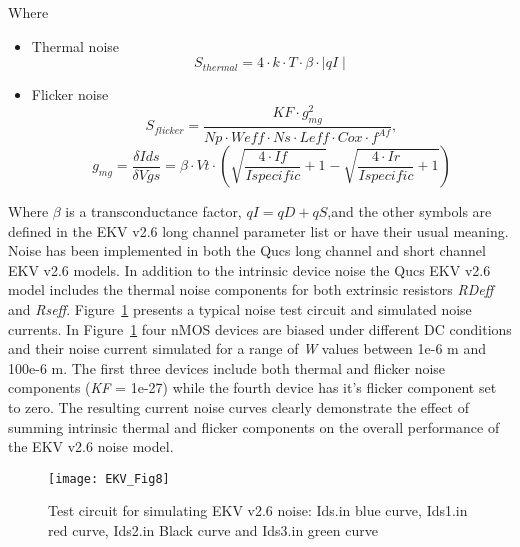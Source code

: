 Where
\begin{itemize}
 \item  Thermal noise
\hspace{20mm}     \begin{equation} 
			S_{thermal}=4 \cdot k \cdot T \cdot \beta \cdot \mid qI \mid
                  \end{equation}  
 \item Flicker noise
\hspace{20mm}     \begin{equation} 
		     S_{flicker} = \dfrac{KF \cdot g_{mg}^{2}}{Np \cdot Weff \cdot Ns \cdot Leff \cdot Cox \cdot f^{Af}},
                  \end{equation}
\hspace{20mm}     \begin{equation} 
		     g_{mg} = \dfrac{\delta Ids}{\delta Vgs} = \beta \cdot Vt \cdot \left( \sqrt{\dfrac{4 \cdot If}{Ispecific}+1}-\sqrt{\dfrac{4 \cdot Ir}{Ispecific}+1} \right) 
                  \end{equation}  
		
\end{itemize}

Where $\beta $ is a transconductance factor, $qI=qD+qS$,and the other
symbols are defined in the EKV v2.6 long channel parameter list or
have their usual meaning. Noise has been implemented in both the Qucs
long channel and short channel EKV v2.6 models. In addition to the
intrinsic device noise the Qucs EKV v2.6 model includes the thermal
noise components for both extrinsic resistors \textit{RDeff} and
\textit{Rseff}. Figure~\ref{fig:EKV8} presents a typical noise test
circuit and simulated noise currents. In Figure~\ref{fig:EKV8} four
nMOS devices are biased under different DC conditions and their noise
current simulated for a range of \textit{W} values between 1e-6 m and
100e-6 m. The first three devices include both thermal and flicker
noise components (\textit{KF} = 1e-27) while the fourth device has
it's flicker component set to zero. The resulting current noise curves
clearly demonstrate the effect of summing intrinsic thermal and
flicker components on the overall performance of the EKV v2.6 noise
model.

\begin{figure}
  \centering
  \texttt{[image: EKV\_Fig8]}
  \caption{Test circuit for simulating EKV v2.6 noise: Ids.in blue curve, Ids1.in red curve, Ids2.in Black curve and Ids3.in green curve }
  \label{fig:EKV8}
\end{figure}  


